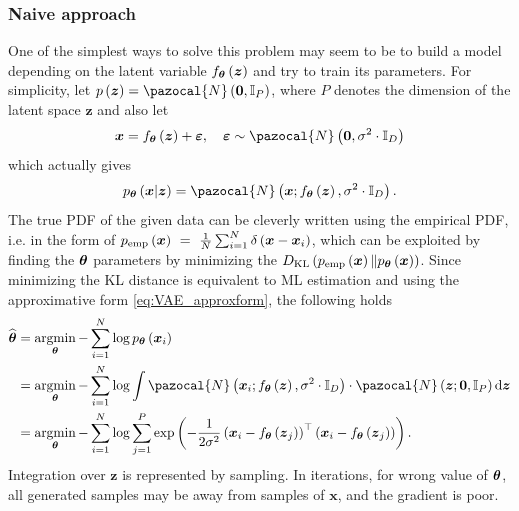 \subsubsection{Naive approach}
One of the simplest ways to solve this problem may seem to be to build a model depending on the latent variable $f_{\boldsymbol{\theta}}\left(\boldsymbol{z}\right)$ and try to train its parameters. For simplicity, let $p\left(\boldsymbol{z} \right) = \pazocal{N}\left(\boldsymbol{0}, \mathbb{I}_P\right)$, where $P$ denotes the dimension of the latent space $\boldsymbol{z}$ and also let
\begin{equation}
\bx = f_{\bt}\left(\boldsymbol{z}\right) + \boldsymbol{\varepsilon}, \quad \boldsymbol{\varepsilon} \sim \pazocal{N}\left(\boldsymbol{0},\sigma^2\cdot\mathbb{I}_D \right)
\end{equation}
which actually gives 
\begin{equation}\label{eq:VAE_decoder}
p_{\bt}\left(\bx\vert\boldsymbol{z}\right) = \pazocal{N}\left(\boldsymbol{x};f_{\bt}\left(\boldsymbol{z}\right),\sigma^2\cdot\mathbb{I}_D \right).
\end{equation}
The true PDF of the given data can be cleverly written using the empirical PDF, i.e. in the form of $p_{\mathrm{emp}}\left(\boldsymbol{x} \right)~=~\frac{1}{N}\sum_{i=1}^N\delta\left(\boldsymbol{x} - \boldsymbol{x}_i\right) $,
which can be exploited by finding the $\boldsymbol{\theta}$ parameters by minimizing the $D_{\mathrm{KL}} \left(p_{\mathrm{emp}}\left(\boldsymbol{x} \right) \Vert p_{\boldsymbol{\theta}}\left(\boldsymbol{x}\right) \right)$. Since minimizing the KL distance is equivalent to ML estimation and using the approximative form \eqref{eq:VAE_approxform}, the following holds 
\begin{align}
    \widehat{\boldsymbol{\bt}} &= \argmin_{\boldsymbol{\bt}}- \sum_{i=1}^N\log p_{\boldsymbol{\bt}}\left(\boldsymbol{x}_i \right)\\
    &=  \argmin_{\boldsymbol{\bt}}- \sum_{i=1}^N \log \int \pazocal{N}\left(\boldsymbol{x}_i;f_{\bt}\left(\boldsymbol{z}\right),\sigma^2\cdot\mathbb{I}_D \right) \cdot \pazocal{N}\left(\boldsymbol{z};\boldsymbol{0}, \mathbb{I}_P\right) \d{\boldsymbol{z}}\\
    &= \argmin_{\boldsymbol{\bt}}- \sum_{i=1}^N \log \sum_{j=1}^{P}\exp\left(-\frac{1}{2\sigma^2}\left(\bx_i-f_{\bt}\left(\boldsymbol{z}_j\right)\right)^\top\left(\bx_i-f_{\bt}\left(\boldsymbol{z}_j\right)\right) \right).
\end{align}
Integration over $\boldsymbol{z}$ is represented by sampling. In iterations, for wrong value of $\boldsymbol{\theta}$, all generated samples may
be away from samples of $\boldsymbol{x}$, and the gradient is poor.


